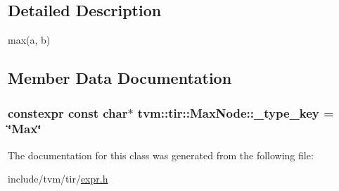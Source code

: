 \subsection{Detailed Description}
max(a, b) 

\subsection{Member Data Documentation}
\subsubsection[{\texorpdfstring{\+\_\+type\+\_\+key}{_type_key}}]{\setlength{\rightskip}{0pt plus 5cm}constexpr const char$\ast$ tvm\+::tir\+::\+Max\+Node\+::\+\_\+type\+\_\+key = \char`\"{}Max\char`\"{}\hspace{0.3cm}{\ttfamily [static]}}\hypertarget{classtvm_1_1tir_1_1MaxNode_a9fff9d6e0159415bf773cc619754d6ec}{}\label{classtvm_1_1tir_1_1MaxNode_a9fff9d6e0159415bf773cc619754d6ec}


The documentation for this class was generated from the following file\+:\begin{DoxyCompactItemize}
\item 
include/tvm/tir/\hyperlink{tir_2expr_8h}{expr.\+h}\end{DoxyCompactItemize}
